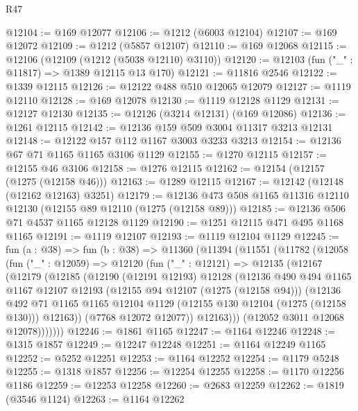 \begin{lexlean}{R47}
\begin{coremodule}
@12104 := @169 @12077
@12106 := @1212 (@6003 @12104)
@12107 := @169 @12072
@12109 := @1212 (@5857 @12107)
@12110 := @169 @12068
@12115 := @12106 (@12109 (@1212 (@5038 @12110) @3110))
@12120 := @12103 (fun ("_" : @11817) => @1389 @12115 @13 @170)
@12121 := @11816 @2546
@12122 := @1339 @12115
@12126 := @12122 @488 @510 @12065 @12079
@12127 := @1119 @12110
@12128 := @169 @12078
@12130 := @1119 @12128 @1129
@12131 := @12127 @12130
@12135 := @12126 (@3214 @12131) (@169 @12086)
@12136 := @1261 @12115
@12142 := @12136 @159 @509 @3004 @11317 @3213 @12131
@12148 := @12122 @157 @112 @1167 @3003 @3233 @3213
@12154 := @12136 @67 @71 @1165 @1165 @3106 @1129
@12155 := @1270 @12115
@12157 := @12155 @46 @3106
@12158 := @1276 @12115
@12162 := @12154 (@12157 (@1275 (@12158 @46)))
@12163 := @1289 @12115
@12167 := @12142 (@12148 (@12162 @12163) @3251)
@12179 := @12136 @473 @508 @1165 @11316 @12110 @12130 (@12155 @89 @12110 (@1275 (@12158 @89)))
@12185 := @12136 @506 @71 @4537 @1165 @12128 @1129
@12190 := @1251 @12115 @471 @495 @1168 @1165
@12191 := @1119 @12107
@12193 := @1119 @12104 @1129
@12245 := fun (a : @38) =>
  fun (b : @38) =>
  @11360
    (@11394
      (@11551
        (@11782
          (@12058
            (fun ("_" : @12059) =>
            @12120
              (fun ("_" : @12121) =>
              @12135
                (@12167
                  (@12179
                    (@12185
                      (@12190
                        (@12191 @12193)
                        @12128
                        (@12136
                          @490
                          @494
                          @1165
                          @1167
                          @12107
                          @12193
                          (@12155 @94 @12107 (@1275 (@12158 @94)))
                          (@12136
                            @492
                            @71
                            @1165
                            @1165
                            @12104
                            @1129
                            (@12155 @130 @12104 (@1275 (@12158 @130)))
                            @12163))
                        (@7768 @12072 @12077))
                      @12163)))
                (@12052 @3011 @12068 @12078)))))))
@12246 := @1861 @1165
@12247 := @1164 @12246
@12248 := @1315 @1857
@12249 := @12247 @12248
@12251 := @1164 @12249 @1165
@12252 := @5252 @12251
@12253 := @1164 @12252
@12254 := @1179 @5248
@12255 := @1318 @1857
@12256 := @12254 @12255
@12258 := @1170 @12256 @1186
@12259 := @12253 @12258
@12260 := @2683 @12259
@12262 := @1819 (@3546 @1124)
@12263 := @1164 @12262

\end{coremodule}
\end{lexlean}
